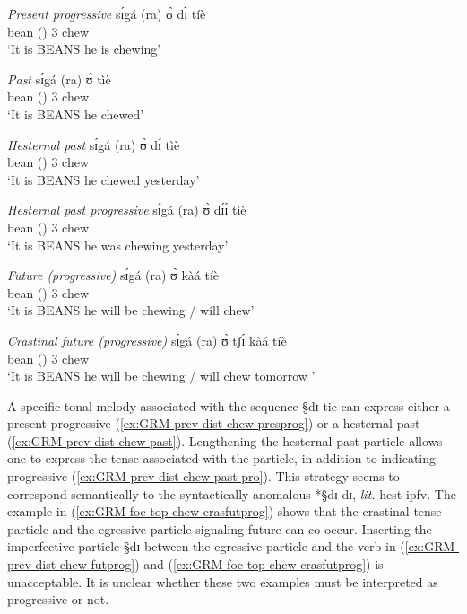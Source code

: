 \begin{exe} 
\ex\label{ex:GRM-prev-dist}
\begin{xlist}
\ex\label{ex:GRM-prev-dist-chew-presprog}{\it Present progressive}
\gll  sɪ́gá (ra)  ʊ̀ dɪ̀  tíè   \\
 bean  ({\foc}) {3\sg} {\ipfv} chew\\
\glt `It is BEANS he is chewing'

 \ex\label{ex:GRM-prev-dist-chew-past}{\it Past}
\gll  sɪ́gá (ra) ʊ̀   tìè     \\
 bean  ({\foc}) {3\sg}  chew \\
\glt `It is BEANS he chewed'


 \ex\label{ex:GRM-prev-dist-chew-past}{\it Hesternal past}
\gll  sɪ́gá (ra) ʊ̀ dɪ́    tìè     \\
 bean  ({\foc}) {3\sg} {\hest}  chew \\
\glt `It is BEANS he chewed yesterday'


 \ex\label{ex:GRM-prev-dist-chew-past-pro}{\it Hesternal past progressive}
\gll  sɪ́gá (ra) ʊ̀ dɪ́ɪ́    tìè     \\
 bean  ({\foc}) {3\sg} {\hest}  chew \\
\glt `It is BEANS he was chewing yesterday'

 \ex\label{ex:GRM-prev-dist-chew-futprog}{\it Future (progressive)}
\gll  sɪ́gá (ra) ʊ̀  kàá   tíè     \\
 bean  ({\foc}) {3\sg} {\fut}  chew \\
\glt `It is BEANS he will be chewing / will chew'

 \ex\label{ex:GRM-foc-top-chew-crasfutprog}{\it Crastinal future (progressive)}
\gll  sɪ́gá (ra) ʊ̀ tʃɪ́  kàá   tíè     \\
 bean  ({\foc}) {3\sg} {\cras} {\fut}   chew \\
\glt `It is BEANS he will be chewing / will chew tomorrow '

\end{xlist}
\end{exe} 

A specific tonal melody associated with  the sequence {\S dɪ tie} can express
either a present progressive (\ref{ex:GRM-prev-dist-chew-presprog}) or a
hesternal past (\ref{ex:GRM-prev-dist-chew-past}). Lengthening the hesternal
past particle allows one to express the tense associated with the particle, in
addition to indicating  progressive (\ref{ex:GRM-prev-dist-chew-past-pro}). This
strategy seems to correspond semantically  to the syntactically anomalous
*{\S dɪ dɪ},  {\it lit.} {\sc hest} {\sc ipfv}.  The example in
(\ref{ex:GRM-foc-top-chew-crasfutprog}) shows that the crastinal tense particle
and the egressive particle signaling  future  can co-occur.  Inserting the
imperfective particle {\S  dɪ} between the egressive particle and
the verb in  (\ref{ex:GRM-prev-dist-chew-futprog}) and
(\ref{ex:GRM-foc-top-chew-crasfutprog}) is  unacceptable. It is unclear whether
these two
examples must be interpreted as progressive or not.  




